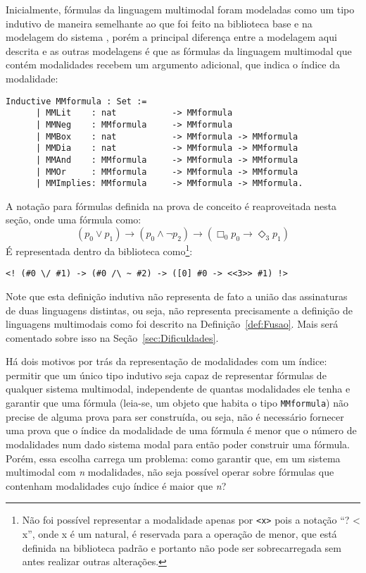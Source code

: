       Inicialmente, fórmulas da linguagem multimodal foram modeladas como um tipo indutivo de maneira semelhante ao que foi feito na biblioteca base e na modelagem do sistema
      \SisT, porém a principal diferença entre a modelagem aqui descrita e as outras modelagens é que as fórmulas da linguagem multimodal que contém modalidades recebem um
      argumento adicional, que indica o índice da modalidade:

      \begin{lstlisting}[language=coq]
    Inductive MMformula : Set :=
      | MMLit    : nat           -> MMformula
      | MMNeg    : MMformula     -> MMformula
      | MMBox    : nat           -> MMformula -> MMformula
      | MMDia    : nat           -> MMformula -> MMformula
      | MMAnd    : MMformula     -> MMformula -> MMformula
      | MMOr     : MMformula     -> MMformula -> MMformula
      | MMImplies: MMformula     -> MMformula -> MMformula.
      \end{lstlisting}

      A notação para fórmulas definida na prova de conceito é reaproveitada nesta seção, onde uma fórmula como:
      \[
        (p_0 \lor p_1) \to (p_0 \land \neg p_2) \to (\Box_{0} p_0 \to \Diamond_{3} p_1)
      \]
      É representada dentro da biblioteca como\footnote{Não foi possível representar a modalidade  apenas por \texttt{<x>} pois a notação ``? < x'', onde x é um natural,
      é reservada para a operação de menor, que está definida na biblioteca padrão e portanto não pode ser sobrecarregada sem antes realizar outras alterações.}:
      \begin{lstlisting}[basicstyle=\ttfamily,columns=fullflexible]
    <! (#0 \/ #1) -> (#0 /\ ~ #2) -> ([0] #0 -> <<3>> #1) !>
      \end{lstlisting}

      Note que esta definição indutiva não representa de fato a união das assinaturas de duas linguagens distintas, ou seja, não representa precisamente a definição de linguagens multimodais
      como foi descrito na Definição~\ref{def:Fusao}. Mais será comentado sobre isso na Seção~\ref{sec:Dificuldades}.

      Há dois motivos por trás da representação de modalidades com um índice: permitir que um único tipo indutivo seja capaz de representar fórmulas de qualquer sistema multimodal,
      independente de quantas modalidades ele tenha e garantir que uma fórmula (leia-se, um objeto que habita o tipo \texttt{MMformula}) não precise de alguma prova para ser construída,
      ou seja, não é necessário fornecer uma prova que o índice da modalidade de uma fórmula é menor que o número de modalidades num dado sistema modal para então poder construir uma fórmula.
      Porém, essa escolha carrega um problema: como garantir que, em um sistema multimodal com \textit{n} modalidades, não seja possível operar sobre fórmulas que contenham modalidades cujo
      índice é maior que \textit{n}?

